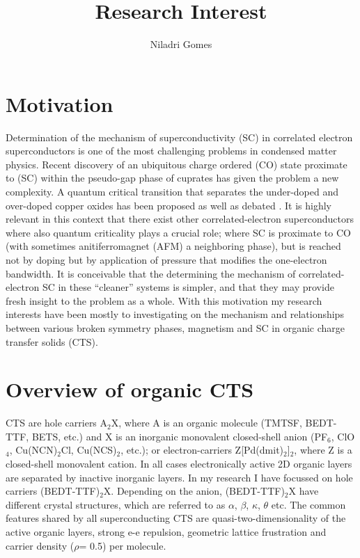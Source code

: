 \documentclass[a4paper,12pt]{article}
\title{\vspace{-2cm}Research Interest}
\author{Niladri Gomes}
\begin{document}
\maketitle



\section{Motivation}
Determination of the mechanism of superconductivity (SC) in correlated electron superconductors is one of the most challenging 
problems in condensed matter physics. Recent discovery of an ubiquitous charge ordered (CO) state proximate to (SC) within the 
pseudo-gap phase of cuprates \cite{ghiringhelli12a,chang12a,comin14a,wu13a} has given the problem a new complexity. A quantum critical
transition that separates the under-doped and over-doped copper oxides has been proposed as well as debated \cite{lee06a,anderson04a,scalapino12a}. It is highly relevant in this context that there exist
other correlated-electron superconductors where also quantum criticality plays a crucial role; where SC is
proximate to CO (with sometimes anitiferromagnet (AFM) a neighboring phase), but is reached not by doping but by application
of pressure that modifies the one-electron bandwidth. It is conceivable that the
determining the mechanism of correlated-electron SC in these “cleaner” systems is simpler,
and that they may provide fresh insight to the problem as a whole. With this motivation my research interests have 
been mostly to investigating on the mechanism and relationships between various broken symmetry phases, 
magnetism and SC in organic charge transfer solids (CTS).  

\section{Overview of organic CTS}
CTS are hole carriers A$_{2}$X, where A is an organic molecule (TMTSF, BEDT-TTF, BETS, etc.) and X is
an inorganic monovalent closed-shell anion (PF$_{6}$, ClO$_{4}$, Cu(NCN)$_{2}$Cl, Cu(NCS)$_{2}$, etc.); or electron-carriers
Z[Pd(dmit)$_{2}$]$_{2}$, where Z is a closed-shell monovalent cation. In all cases electronically active 2D organic
layers are separated by inactive inorganic layers. In my research I have focussed on hole carriers (BEDT-TTF)$_{2}$X. Depending
on the anion, (BEDT-TTF)$_{2}$X have different crystal structures, which are referred to as $\alpha$, $\beta$, $\kappa$, $\theta$ etc. 
The common features shared by all superconducting CTS are quasi-two-dimensionality of
the active organic layers, strong e-e repulsion, geometric lattice frustration and carrier density ($\rho$= 0.5) per molecule.
\end{document}

